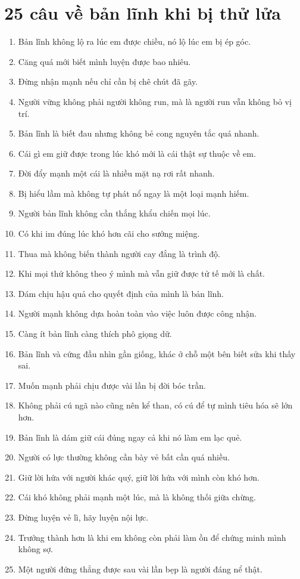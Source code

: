 \section{25 câu về bản lĩnh khi bị thử lửa}
\begin{enumerate}[leftmargin=*,resume]
\item Bản lĩnh không lộ ra lúc em được chiều, nó lộ lúc em bị ép góc.
\item Căng quá mới biết mình luyện được bao nhiêu.
\item Đừng nhận mạnh nếu chỉ cần bị chê chút đã gãy.
\item Người vững không phải người không run, mà là người run vẫn không bỏ vị trí.
\item Bản lĩnh là biết đau nhưng không bẻ cong nguyên tắc quá nhanh.
\item Cái gì em giữ được trong lúc khó mới là cái thật sự thuộc về em.
\item Đời đẩy mạnh một cái là nhiều mặt nạ rơi rất nhanh.
\item Bị hiểu lầm mà không tự phát nổ ngay là một loại mạnh hiếm.
\item Người bản lĩnh không cần thắng khẩu chiến mọi lúc.
\item Có khi im đúng lúc khó hơn cãi cho sướng miệng.
\item Thua mà không biến thành người cay đắng là trình độ.
\item Khi mọi thứ không theo ý mình mà vẫn giữ được tử tế mới là chất.
\item Dám chịu hậu quả cho quyết định của mình là bản lĩnh.
\item Người mạnh không dựa hoàn toàn vào việc luôn được công nhận.
\item Càng ít bản lĩnh càng thích phô giọng dữ.
\item Bản lĩnh và cứng đầu nhìn gần giống, khác ở chỗ một bên biết sửa khi thấy sai.
\item Muốn mạnh phải chịu được vài lần bị đời bóc trần.
\item Không phải cú ngã nào cũng nên kể than, có cú để tự mình tiêu hóa sẽ lớn hơn.
\item Bản lĩnh là dám giữ cái đúng ngay cả khi nó làm em lạc quẻ.
\item Người có lực thường không cần bày vẻ bất cần quá nhiều.
\item Giữ lời hứa với người khác quý, giữ lời hứa với mình còn khó hơn.
\item Cái khó không phải mạnh một lúc, mà là không thối giữa chừng.
\item Đừng luyện vẻ lì, hãy luyện nội lực.
\item Trưởng thành hơn là khi em không còn phải làm ồn để chứng minh mình không sợ.
\item Một người đứng thẳng được sau vài lần bẹp là người đáng nể thật.
\end{enumerate}

